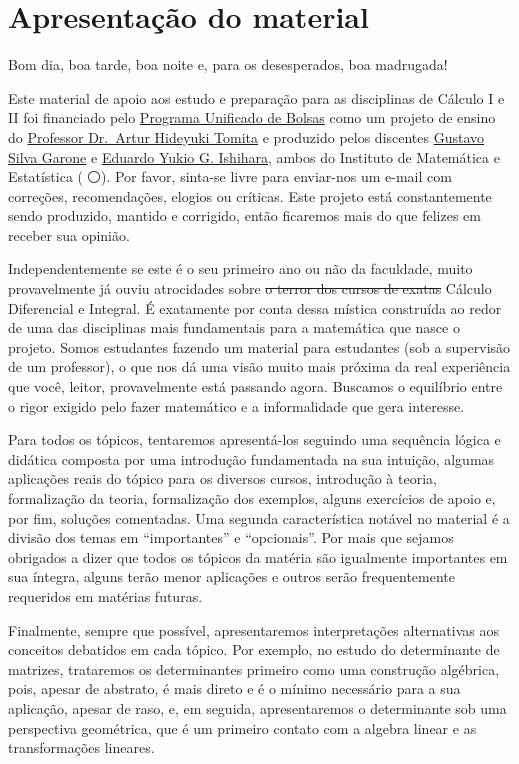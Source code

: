 \documentclass[
  letterpaper,
  DIV=11,
  numbers=noendperiod]{scrreprt}
\begin{document}
\section{Apresentação do material}\label{apresentauxe7uxe3o-do-material}

Bom dia, boa tarde, boa noite e, para os desesperados, boa madrugada! 👋

Este material de apoio aos estudo e preparação para as disciplinas de
Cálculo I e II foi financiado pelo
\href{https://prip.usp.br/pub/}{Programa Unificado de Bolsas} como um
projeto de ensino do \href{https://www.ime.usp.br/~tomita/}{Professor
Dr.~Artur Hideyuki Tomita} e produzido pelos discentes
\href{gustavo.garone@usp.br}{Gustavo Silva Garone} e
\href{eduardoyukio.ishihara@usp.br}{Eduardo Yukio G. Ishihara}, ambos do
Instituto de Matemática e Estatística (🔴⚪). Por favor, sinta-se livre
para enviar-nos um e-mail com correções, recomendações, elogios ou
críticas. Este projeto está constantemente sendo produzido, mantido e
corrigido, então ficaremos mais do que felizes em receber sua opinião.

Independentemente se este é o seu primeiro ano ou não da faculdade,
muito provavelmente já ouviu atrocidades sobre \st{o terror dos cursos
de exatas} Cálculo Diferencial e Integral. É exatamente por conta dessa
mística construída ao redor de uma das disciplinas mais fundamentais
para a matemática que nasce o projeto. Somos estudantes fazendo um
material para estudantes (sob a supervisão de um professor), o que nos
dá uma visão muito mais próxima da real experiência que você, leitor,
provavelmente está passando agora. Buscamos o equilíbrio entre o rigor
exigido pelo fazer matemático e a informalidade que gera interesse.

Para todos os tópicos, tentaremos apresentá-los seguindo uma sequência
lógica e didática composta por uma introdução fundamentada na sua
intuição, algumas aplicações reais do tópico para os diversos cursos,
introdução à teoria, formalização da teoria, formalização dos exemplos,
alguns exercícios de apoio e, por fim, soluções comentadas. Uma segunda
característica notável no material é a divisão dos temas em
``importantes'' e ``opcionais''. Por mais que sejamos obrigados a dizer
que todos os tópicos da matéria são igualmente importantes em sua
íntegra, alguns terão menor aplicações e outros serão frequentemente
requeridos em matérias futuras.

Finalmente, sempre que possível, apresentaremos interpretações
alternativas aos conceitos debatidos em cada tópico. Por exemplo, no
estudo do determinante de matrizes, trataremos os determinantes primeiro
como uma construção algébrica, pois, apesar de abstrato, é mais direto e
é o mínimo necessário para a sua aplicação, apesar de raso, e, em
seguida, apresentaremos o determinante sob uma perspectiva geométrica,
que é um primeiro contato com a algebra linear e as transformações
lineares.
\end{document}
